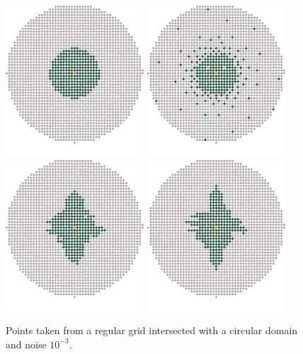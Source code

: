 \documentclass[review,supplement,onefignum,onetabnum]{siamonline220329}
\begin{document}
\begin{figure}[H]
  \centering
  \includegraphics{figures/precompiled/sphere_1e-3/points_1.pdf}%
  \quad
  \includegraphics{figures/precompiled/sphere_1e-3/points_2.pdf}%
  \quad
  \includegraphics{figures/precompiled/sphere_1e-3/points_3.pdf}%
  \quad
  \includegraphics{figures/precompiled/sphere_1e-3/points_4.pdf}%
  \caption{
    Points taken from a regular grid intersected
    with a circular domain and noise \( 10^{-3} \).
  }
\end{figure}
\end{document}
